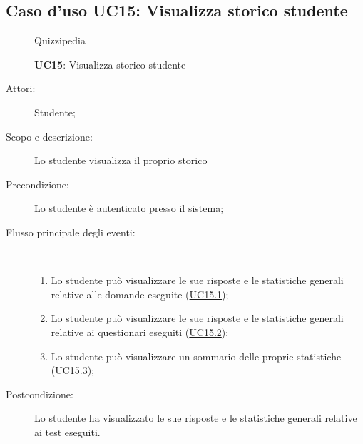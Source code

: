 \subsection{Caso d'uso UC15: Visualizza storico studente}
	\begin{figure}[H]
		\centering
		\begin{resizedtikzpicture}{\textwidth}
		\begin{umlsystem}[x=0, fill=lightgray!20]{Quizzipedia}
		\end{umlsystem}
		\end{resizedtikzpicture}
		\caption{\textbf{UC15}: Visualizza storico studente}
		\label{UC15}
	\end{figure}
\begin{description}
\item[Attori:] Studente;
\item[Scopo e descrizione:] Lo studente visualizza il proprio storico
      \item[Precondizione:] Lo studente è autenticato presso il sistema;

        \item[Flusso principale degli eventi:] \ 
 \begin{enumerate}
          \item Lo studente può visualizzare le sue risposte e le statistiche generali relative alle domande eseguite (\hyperlink{UC15.1}{UC15.1});
          \item Lo studente può visualizzare le sue risposte e le statistiche generali relative ai questionari eseguiti (\hyperlink{UC15.2}{UC15.2});
          \item Lo studente può visualizzare un sommario delle proprie statistiche (\hyperlink{UC15.3}{UC15.3});

      \end{enumerate}
    \item[Postcondizione:] Lo studente ha visualizzato le sue risposte e le statistiche generali relative ai test eseguiti.
  \end{description}
\hypertarget{UC15.1}{}
